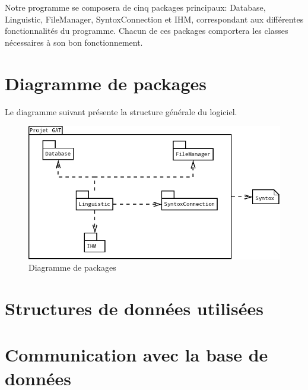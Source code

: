 \documentclass[12pt]{report}
\begin{document}
	


Notre programme se composera de cinq packages principaux: Database, Linguistic, FileManager, SyntoxConnection et IHM, correspondant aux différentes fonctionnalités du programme.
Chacun de ces packages comportera les classes nécessaires à son bon fonctionnement.

\section{Diagramme de packages}
Le diagramme suivant présente la structure générale du logiciel.

\begin{figure}[!h]
\begin{center}
\includegraphics[scale=0.45]{DiagPackages.png}
\caption{Diagramme de packages}
\end{center}
\end{figure}









\FloatBarrier


\section{Structures de données utilisées}

\section{Communication avec la base de données}
\end{document}
